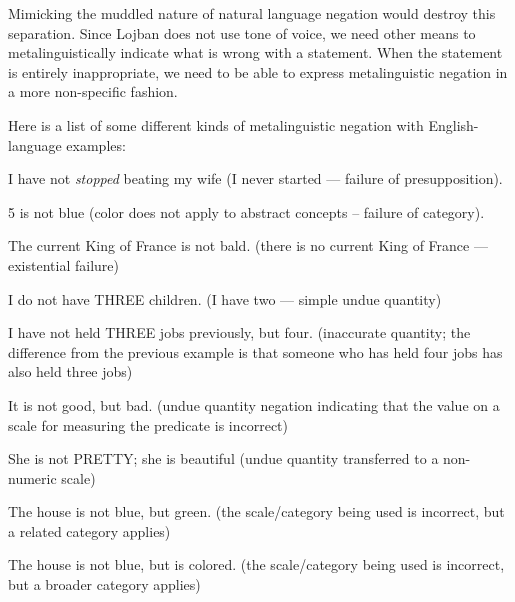 Mimicking the muddled nature of natural language negation
    would destroy this separation. Since Lojban does not use tone
    of voice, we need other means to metalinguistically indicate
    what is wrong with a statement. When the statement is entirely
    inappropriate, we need to be able to express metalinguistic
    negation in a more non-specific fashion.

Here is a list of some different kinds of metalinguistic
    negation with English-language examples:
\begin{example}
I have not \textit{stopped} beating my wife\n
(I never started --- failure of presupposition).
\end{example}

\begin{example}
5 is not blue\n
(color does not apply to abstract concepts --\n
failure of category).
\end{example}

\begin{example}
The current King of France is not bald.\n
(there is no current King of France ---\n
existential failure)
\end{example}

\begin{example}
I do not have THREE children.\n
(I have two --- simple undue quantity)
\end{example}

\begin{example}
I have not held THREE jobs previously, but four.\n
(inaccurate quantity; the difference from the previous\n
example is that someone who has held four jobs has also\n
held three jobs)
\end{example}

\begin{example}
It is not good, but bad.\n
(undue quantity negation indicating that the value on a\n
scale for measuring the predicate is incorrect)
\end{example}

\begin{example}
She is not PRETTY; she is beautiful\n
(undue quantity transferred to a non-numeric scale)
\end{example}

\begin{example}
The house is not blue, but green.\n
(the scale/category being used is incorrect, but a\n
related category applies)
\end{example}

\begin{example}
The house is not blue, but is colored.\n
(the scale/category being used is incorrect, but a\n
broader category applies)
\end{example}

